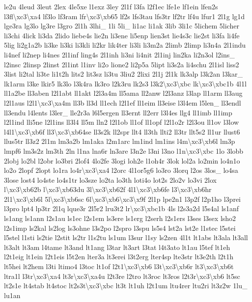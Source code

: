 \begin{DoxyCompactItemize}
le2u 4leud 3leut 2lex 4le5xe l1exz 3ley 2l1f l3fa l2f1ec lfe1e lf1ein lfen2s l3fl\textbackslash{}xc3\textbackslash{}xa4 lf3lo lf3ram lfr\textbackslash{}xc3\textbackslash{}xb65 lf2s lfs3tau lfs3tr lf2tr lf4u lfur1 2l1g lg1d lge3ra lg3lo lg3re l3gro 2l1h 3lhi\-\_\- 1li 5li\-\_\- li1ac li1ak 3lib 3li1c 5lichem 5licher li3chi 4lick li3da 2lido liebe4s lie2n li3ene li5enp lien3st lie4s3c lie2st li3fa li4fe 5lig li2g1a2b li3ke li3ki li3kli li2kr lik4ter li3li li3m2a 2limb 2limp li3n4a 2l1indu li4nef li2nep li4nes 2l1inf ling4s 2l1inh li3ni li4nit 2l1inj lin2ka li2n3ol l2ins\-\_\- l2insc 2linsp 2linst 2l1int l1inv li2o lione2 li2p5a 5lipt li3s2a li4schu 2l1isl liss2 3list li2tal li3te li1t2h lits2 lit3sz li3tu 3liu2 2lixi 2l1j 2l1k lk3alp l3k2an l3kar\-\_\- lk1arm l3ke lkir5 lk3lo l3k4ra lk3ro l2k3ru lk2s3 l3k2\textbackslash{}xc3\textbackslash{}xbc lk\textbackslash{}xc3\textbackslash{}xbc1b 4l1l ll1a2be ll3aben l2l1abt ll1akt l2l3a4m ll5ama ll2anw l2l3anz l3lap ll1arm ll3aug l2l1aus l2l1\textbackslash{}xc3\textbackslash{}xa4m ll3b ll3d ll1ech l2l1ef ll1eim ll3eise l3l4em l5len\-\_\- ll3endl ll3endu l4lents l3ler\-\_\- lle2r3a l6l5ergen ll3ernt ll2err l3l4es llg4 ll1imb ll1imp l2l1ind lli5ne l2l1ins ll3l4 ll5m lln2 l2l1ob ll1of ll1opf l2l1o2r l2l3ou ll1ov l3low l4l1\textbackslash{}xc3\textbackslash{}xb6f ll3\textbackslash{}xc3\textbackslash{}xb64se ll3s2k ll2spr llt4 ll3th llti2 ll3tr llt5s2 ll1ur llust6 llus5tr ll3z2 2l1m lm3a2b lm1aka l2m1arc lm1ind lm1ins l4m\textbackslash{}xc3\textbackslash{}xb6l lm3p lmpf6 lm3s2z lm3th 2ln l1na lna6r ln3are l3n2e l3ni l3no l1n\textbackslash{}xc3\textbackslash{}xbc 1lo 3lobb 2lobj lo2bl l2obr lo3bri 2lof4 4lo2fe 3logi loh2e l1oh4r 3lok lol2a lo2min lo4n1o lo2o 2lopf 2lopt lo1ra lo4r\textbackslash{}xc3\textbackslash{}xa4 l2orc 4l1or5g6 lo3ro 3lorq l2os 3los\-\_\- lo4sa 3lose lost4 lo4ste lo4s1tr lo3sze lo2ta lo3th loti4o lot2s 2lo2v lo3vi 2lox l\textbackslash{}xc3\textbackslash{}xb62b l\textbackslash{}xc3\textbackslash{}xb63du 3l\textbackslash{}xc3\textbackslash{}xb62f 4l1\textbackslash{}xc3\textbackslash{}xb6fe l3\textbackslash{}xc3\textbackslash{}xb6hr 2l1\textbackslash{}xc3\textbackslash{}xb6l 5l\textbackslash{}xc3\textbackslash{}xb6sc 6l\textbackslash{}xc3\textbackslash{}xb6\textbackslash{}xc3\textbackslash{}x9f 2l1p lpe2n1 l3p2f l2p1ho l3prei l3pro lpt4 lp3tr 2l1q lque3r 2l5r2 lru3t2 lr\textbackslash{}xc3\textbackslash{}xbc1b 4ls l2s3a2d l5s4al ls1anf ls1ang ls1ann l2s1au ls1ec l2s1em ls3ere ls1erg l2serh l2s1ers l3ses l3sex lsho2 l2s1imp ls2kal ls2log ls3ohne l3s2po l2spro l3spu ls5s4 lst2a lst2e l1stec l5stei l5stel l1sti ls2tie l2stit ls2tr l1s2tu ls1um l3sur l1sy ls2zen 4l1t lt1abs lt3ala lt3all lt3alt lt3am l4tame lt3and lt1ang l3tar lt3art l3tat l4t3ato lt1au l5tef lt1eh l2t1eig lt1ein l2t1eis l5t2en lter3a lt3erei l3t2erg lter4sp lte3str lt3e2th l2t1h lt5hei lt2hem l3ti ltimo4 l3toc lt1of l2t1\textbackslash{}xc3\textbackslash{}xb6 l3t\textbackslash{}xc3\textbackslash{}xb6r lt3\textbackslash{}xc3\textbackslash{}xb6t ltra1l l3tr\textbackslash{}xc3\textbackslash{}xa4 lt3r\textbackslash{}xc3\textbackslash{}xa4u l2t3re l2tro lt3roc lt3ros l2t3r\textbackslash{}xc3\textbackslash{}xb6 lt5sc lt2s1e lt4stab lt4stoc lt2s3t\textbackslash{}xc3\textbackslash{}xbc lt3t lt1uh l2t1um ltu4rer ltu2ri lt3z2w 1lu\-\_\- lu1an 
\end{DoxyCompactItemize}
